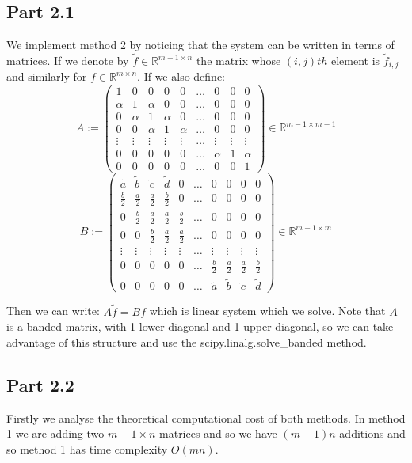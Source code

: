 \documentclass[a4paper, oneside]{book}
\begin{document}
\subsection*{Part 2.1}
We implement method 2 by noticing that the system can be written in terms of matrices.
If we denote by $\tilde{f} \in \mathbb{R}^{m-1 \times n}$ the matrix whose $(i,j){th}$ element is $\tilde{f}_{i,j}$ and similarly for $f \in \mathbb{R}^{m \times n}$.
If we also define: 
$$
A := \begin{pmatrix}
1 & 0 & 0 & 0 & 0 & \dots & 0 & 0 & 0 \\
\alpha & 1 & \alpha & 0 & 0 & \dots & 0 & 0 & 0 \\
0 & \alpha & 1 & \alpha & 0 & \dots & 0 & 0 & 0 \\
0 & 0 & \alpha & 1 & \alpha & \dots & 0 & 0 & 0 \\
\vdots & \vdots & \vdots & \vdots & \vdots & \dots & \vdots & \vdots & \vdots \\
0 & 0 & 0 & 0 & 0 & \dots & \alpha & 1 & \alpha \\
0 & 0 & 0 & 0 & 0 & \dots & 0 & 0 & 1
\end{pmatrix} \in \mathbb{R}^{m-1 \times m-1}
$$
$$
B := \begin{pmatrix}
\tilde{a} & \tilde{b} & \tilde{c}  & \tilde{d}  & 0 & \dots & 0 &  0 & 0 & 0 \\
\frac{b}{2} & \frac{a}{2} & \frac{a}{2} & \frac{b}{2} & 0 & \dots & 0 & 0 & 0 & 0 \\
0 & \frac{b}{2} & \frac{a}{2} & \frac{a}{2} & \frac{b}{2} & \dots & 0 & 0 & 0 & 0 \\
0 & 0 & \frac{b}{2} & \frac{a}{2} & \frac{a}{2}  & \dots & 0 & 0 & 0 & 0 \\
\vdots  & \vdots & \vdots  & \vdots  & \vdots  & \dots & \vdots  & \vdots  & \vdots & \vdots \\
0 & 0 & 0 & 0 & 0 & \dots & \frac{b}{2} & \frac{a}{2} & \frac{a}{2} & \frac{b}{2} \\
0 & 0 & 0 & 0 & 0 & \dots & \tilde{a} & \tilde{b} & \tilde{c} & \tilde{d}
\end{pmatrix} \in \mathbb{R}^{m-1 \times m}
$$

Then we can write:  $A \tilde{f} = B f$  which is linear system which we solve.
Note that $A$ is a banded matrix, with 1 lower diagonal and 1 upper diagonal,
so we can take advantage of this structure and use the scipy.linalg.solve\_banded
method.

\subsection*{Part 2.2}
Firstly we analyse the theoretical computational cost of both methods.
In method 1 we are adding two $m-1 \times n$ matrices and so we have $(m-1)n$ additions
and so method 1 has time complexity $O(mn)$.
\end{document}
